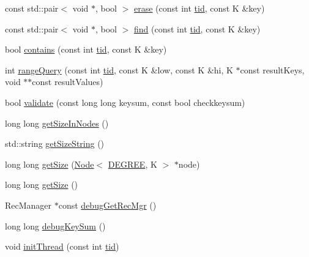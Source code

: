 \begin{DoxyCompactItemize}
\item 
const std\+::pair$<$ void $\ast$, bool $>$ \hyperlink{classabtree__ns_1_1abtree_a59a638bd5a3fc2cd53893ec8c80a0970}{erase} (const int \hyperlink{microbench_2main_8cpp_a9ca9869868fe7e7a38a921cc7de4103f}{tid}, const K \&key)
\item 
const std\+::pair$<$ void $\ast$, bool $>$ \hyperlink{classabtree__ns_1_1abtree_afe6bc900a49ea86e5c12e4ab1eb2ce24}{find} (const int \hyperlink{microbench_2main_8cpp_a9ca9869868fe7e7a38a921cc7de4103f}{tid}, const K \&key)
\item 
bool \hyperlink{classabtree__ns_1_1abtree_a2ded16e5076cd0217938605fa479e817}{contains} (const int \hyperlink{microbench_2main_8cpp_a9ca9869868fe7e7a38a921cc7de4103f}{tid}, const K \&key)
\item 
int \hyperlink{classabtree__ns_1_1abtree_a3a820c6f4e9cc7af26106ecf808524c7}{range\+Query} (const int \hyperlink{microbench_2main_8cpp_a9ca9869868fe7e7a38a921cc7de4103f}{tid}, const K \&low, const K \&hi, K $\ast$const result\+Keys, void $\ast$$\ast$const result\+Values)
\item 
bool \hyperlink{classabtree__ns_1_1abtree_afb8fab7fb71a7181ab344faf8187605c}{validate} (const long long keysum, const bool checkkeysum)
\item 
long long \hyperlink{classabtree__ns_1_1abtree_af3fa6cabe01588518bf742b6fa951895}{get\+Size\+In\+Nodes} ()
\item 
std\+::string \hyperlink{classabtree__ns_1_1abtree_a2d3de27451d8f4ace50883760b88b37c}{get\+Size\+String} ()
\item 
long long \hyperlink{classabtree__ns_1_1abtree_a2da603531e2fbd1d4ed0f7dd869b419a}{get\+Size} (\hyperlink{structabtree__ns_1_1Node}{Node}$<$ \hyperlink{brown__sigouin__abtree__kcas_2adapter_8h_a5d88b17d70c985f2f2b8e987037fd6dd}{D\+E\+G\+R\+EE}, K $>$ $\ast$node)
\item 
long long \hyperlink{classabtree__ns_1_1abtree_aab64503fd00b60c5badb7bbe492895b1}{get\+Size} ()
\item 
Rec\+Manager $\ast$const \hyperlink{classabtree__ns_1_1abtree_a6fa33b8da342f9df9d17e2efeb4fd753}{debug\+Get\+Rec\+Mgr} ()
\item 
long long \hyperlink{classabtree__ns_1_1abtree_a68b1790129b4a9733717d32d0d9c572a}{debug\+Key\+Sum} ()
\item 
void \hyperlink{classabtree__ns_1_1abtree_a04d2955852cc93867ec9ffcd40d27883}{init\+Thread} (const int \hyperlink{microbench_2main_8cpp_a9ca9869868fe7e7a38a921cc7de4103f}{tid})
\item 
$$
\end{DoxyCompactItemize}
